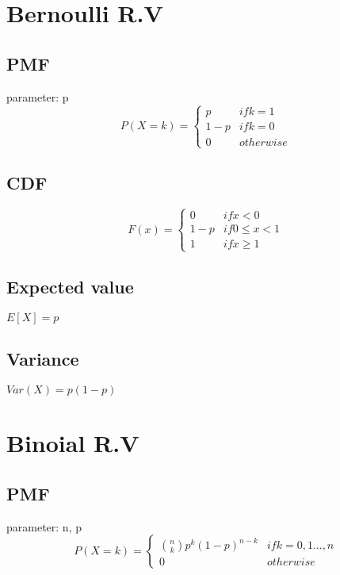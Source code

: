 \section{Bernoulli R.V}
    \subsection*{PMF}
        parameter: p
        \begin{equation*}
            P(X=k)=
            \begin{cases}
                p & if k = 1 \\
                1-p & if k = 0 \\
                0 & otherwise
            \end{cases}
        \end{equation*}

    \subsection*{CDF}
        \begin{equation*}
            F(x)=
            \begin{cases}
                0 & if x < 0 \\
                1-p & if 0 \leq x < 1 \\
                1 & if x \geq 1
            \end{cases}
        \end{equation*}

    \subsection*{Expected value}
        $E[X] = p$

    \subsection*{Variance}
        $Var(X)=p(1-p)$

\section{Binoial R.V}
    \subsection*{PMF}
        parameter: n, p
        \begin{equation*}
            P(X=k)=
            \begin{cases}
                \binom{n}{k} p^k (1-p)^{n-k} & if k = 0,1...,n \\
                0 & otherwise
            \end{cases}
        \end{equation*}

